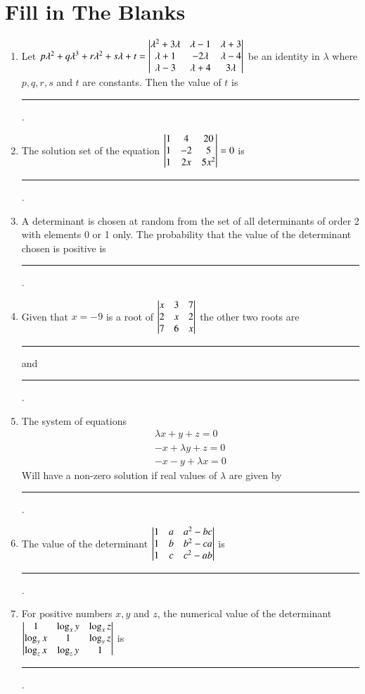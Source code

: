 \documentclass[journal,12pt,twocolumn]{IEEEtran}
\theoremstyle{remark}
\begin{document}
\section{Fill in The Blanks}
\begin{enumerate}[label=\arabic*.]
	\item Let $p\lambda^2 + q\lambda^3 + r\lambda^2 + s\lambda + t =
		\begin{vmatrix}
			\lambda^2 + 3\lambda & \lambda - 1 & \lambda + 3 \\
			\lambda + 1 & -2\lambda & \lambda - 4 \\
			\lambda - 3 & \lambda+ 4 & 3\lambda
		\end{vmatrix}$ be an identity in $\lambda$ where $p, q, r, s$ and $t$ are constants.
		Then the value of $t$ is \rule{1cm}{0.15mm}.
		\hfill {}
	
	\item The solution set of the equation $\begin{vmatrix}
			1 & 4 & 20 \\
			1 & -2 & 5 \\
			1 & 2x & 5x^2
		\end{vmatrix} = 0$ is \rule{1cm}{0.15mm}.
		\hfill {}

	\item A determinant is chosen at random from the set of all determinants of order
		2 with elements 0 or 1 only. The probability that the value of the determinant
		chosen is positive is \rule{1cm}{0.15mm}.
		\hfill {}

	\item Given that $x = -9$ is a root of $\begin{vmatrix}
			x & 3 & 7 \\
			2 & x & 2 \\
			7 & 6 & x
		\end{vmatrix}$ the other two roots are \rule{1cm}{0.15mm} and \rule{1cm}{0.15mm}.
		\hfill {}

	\item The system of equations
		\begin{gather*}
			\lambda x + y + z = 0 \\
			-x + \lambda y + z = 0 \\
			-x - y + \lambda x = 0
		\end{gather*}
		Will have a non-zero solution if real values of $\lambda$ are given by
		\rule{1cm}{0.15mm}.
		\hfill {}

	\item The value of the determinant $\begin{vmatrix}
			1 & a & a^2 - bc \\
			1 & b & b^2 - ca \\
			1 & c & c^2 - ab
		\end{vmatrix}$ is \rule{1cm}{0.15mm}.	
		\hfill {}

	\item For positive numbers $x, y$ and $z$, the numerical value of the determinant
		$\begin{vmatrix}
			1 & \log_x{y} & \log_x{z} \\
			\log_y{x} & 1 & \log_y{z} \\
			\log_z{x} & \log_z{y} & 1 \\
		\end{vmatrix}$ is \rule{1cm}{0.15mm}.
		\hfill {}
\end{enumerate}
\end{document}
